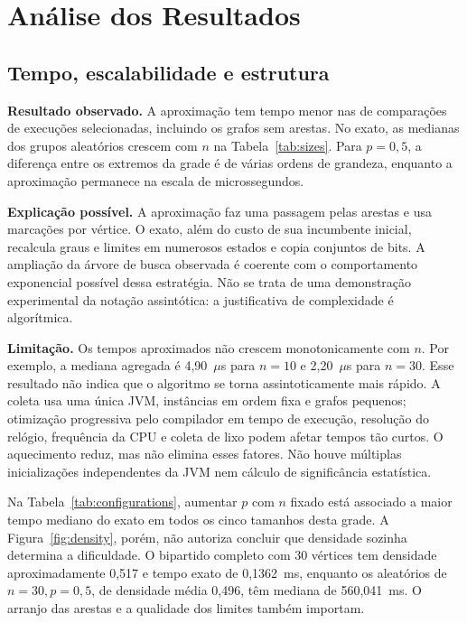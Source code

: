 \section{Análise dos Resultados}
\label{sec:analysis}

\subsection{Tempo, escalabilidade e estrutura}

\textbf{Resultado observado.}
A aproximação tem tempo menor nas \FasterApproxInstances{} de
\TotalInstances{} comparações de execuções selecionadas, incluindo
os grafos sem arestas. No exato, as medianas dos grupos aleatórios
crescem com $n$ na Tabela~\ref{tab:sizes}. Para $p=0{,}5$,
a diferença entre os extremos da grade é de várias ordens de
grandeza, enquanto a aproximação permanece na escala de
microssegundos.

\textbf{Explicação possível.}
A aproximação faz uma passagem pelas arestas e usa marcações
por vértice. O exato, além do custo de sua incumbente inicial,
recalcula graus e limites em numerosos estados e copia conjuntos
de bits. A ampliação da árvore de busca observada é coerente
com o comportamento exponencial possível dessa estratégia.
Não se trata de uma demonstração experimental da notação
assintótica: a justificativa de complexidade é algorítmica.

\textbf{Limitação.}
Os tempos aproximados não crescem monotonicamente com $n$.
Por exemplo, a mediana agregada é 4,90~$\mu$s para $n=10$
e 2,20~$\mu$s para $n=30$. Esse resultado não indica que o
algoritmo se torna assintoticamente mais rápido. A coleta usa
uma única JVM, instâncias em ordem fixa e grafos pequenos;
otimização progressiva pelo compilador em tempo de execução,
resolução do relógio, frequência da CPU e coleta de lixo
podem afetar tempos tão curtos. O aquecimento reduz, mas
não elimina esses fatores. Não houve múltiplas inicializações
independentes da JVM nem cálculo de significância estatística.

Na Tabela~\ref{tab:configurations}, aumentar $p$ com $n$ fixado
está associado a maior tempo mediano do exato em todos os
cinco tamanhos desta grade. A Figura~\ref{fig:density}, porém,
não autoriza concluir que densidade sozinha determina a
dificuldade. O bipartido completo com 30 vértices tem
densidade aproximadamente 0,517 e tempo exato de 0,1362~ms,
enquanto os aleatórios de $n=30,p=0{,}5$, de densidade média
0,496, têm mediana de 560,041~ms. O arranjo das arestas e a
qualidade dos limites também importam.

